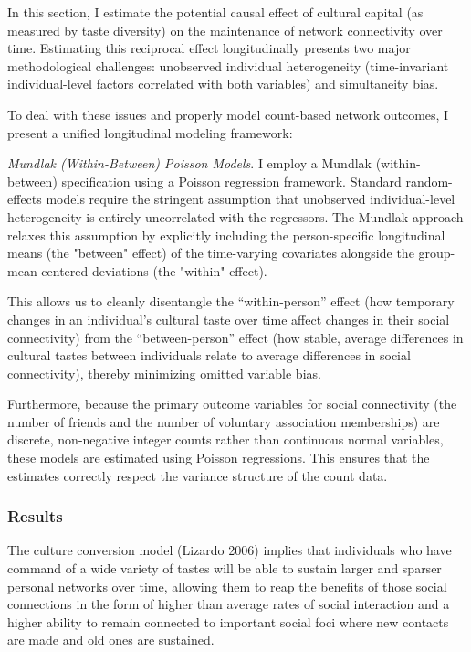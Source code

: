 \documentclass[
]{article}
\begin{document}
In this section, I estimate the potential causal effect of cultural capital (as measured by taste diversity) on the maintenance of network connectivity over time. Estimating this reciprocal effect longitudinally presents two major methodological challenges: unobserved individual heterogeneity (time-invariant individual-level factors correlated with both variables) and simultaneity bias.

To deal with these issues and properly model count-based network outcomes, I present a unified longitudinal modeling framework:

\emph{Mundlak (Within-Between) Poisson Models}. I employ a Mundlak (within-between) specification using a Poisson regression framework. Standard random-effects models require the stringent assumption that unobserved individual-level heterogeneity is entirely uncorrelated with the regressors. The Mundlak approach relaxes this assumption by explicitly including the person-specific longitudinal means (the "between" effect) of the time-varying covariates alongside the group-mean-centered deviations (the "within" effect). 

This allows us to cleanly disentangle the ``within-person'' effect (how temporary changes in an individual's cultural taste over time affect changes in their social connectivity) from the ``between-person'' effect (how stable, average differences in cultural tastes between individuals relate to average differences in social connectivity), thereby minimizing omitted variable bias. 

Furthermore, because the primary outcome variables for social connectivity (the number of friends and the number of voluntary association memberships) are discrete, non-negative integer counts rather than continuous normal variables, these models are estimated using Poisson regressions. This ensures that the estimates correctly respect the variance structure of the count data.

\subsubsection{Results}\label{results-1}

The culture conversion model (Lizardo 2006) implies that individuals who have command of a wide variety of tastes will be able to sustain larger and sparser personal networks over time, allowing them to reap the benefits of those social connections in the form of higher than average rates of social interaction and a higher ability to remain connected to important social foci where new contacts are made and old ones are sustained. 
\end{document}
